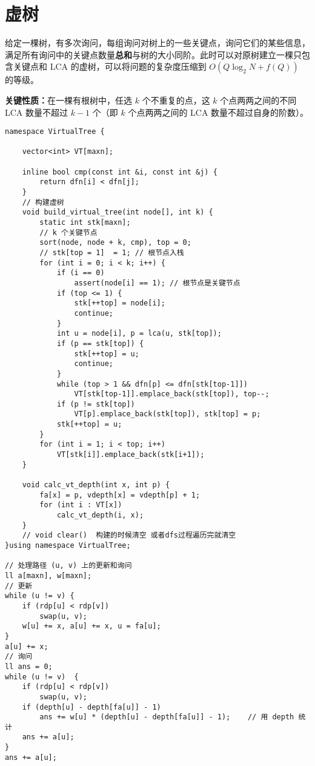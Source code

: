 \section{虚树}

\par \noindent 给定一棵树，有多次询问，每组询问对树上的一些关键点，询问它们的某些信息，满足所有询问中的关键点数量\textbf{总和}与树的大小同阶。此时可以对原树建立一棵只包含关键点和 LCA 的虚树，可以将问题的复杂度压缩到 $O(Q \log_2N + f(Q))$ 的等级。
~\\
\par \noindent \textbf{关键性质：}在一棵有根树中，任选 $k$ 个不重复的点，这  $k$ 个点两两之间的不同 LCA 数量不超过  $k-1$  个（即  $k$ 个点两两之间的 LCA 数量不超过自身的阶数）。
\begin{verbatim}
namespace VirtualTree {
    
    vector<int> VT[maxn];
    
    inline bool cmp(const int &i, const int &j) {
        return dfn[i] < dfn[j];
    }
    // 构建虚树
    void build_virtual_tree(int node[], int k) {
        static int stk[maxn];
        // k 个关键节点
        sort(node, node + k, cmp), top = 0;
        // stk[top = 1]  = 1; // 根节点入栈
        for (int i = 0; i < k; i++) {   
            if (i == 0)
                assert(node[i] == 1); // 根节点是关键节点
            if (top <= 1) {
                stk[++top] = node[i];
                continue;
            }
            int u = node[i], p = lca(u, stk[top]);
            if (p == stk[top]) {
                stk[++top] = u;
                continue;
            }
            while (top > 1 && dfn[p] <= dfn[stk[top-1]])
                VT[stk[top-1]].emplace_back(stk[top]), top--;
            if (p != stk[top])
                VT[p].emplace_back(stk[top]), stk[top] = p;
            stk[++top] = u;
        }
        for (int i = 1; i < top; i++)
            VT[stk[i]].emplace_back(stk[i+1]);
    }

    void calc_vt_depth(int x, int p) {
        fa[x] = p, vdepth[x] = vdepth[p] + 1;
        for (int i : VT[x])
            calc_vt_depth(i, x);
    }
    // void clear()  构建的时候清空 或者dfs过程遍历完就清空
}using namespace VirtualTree;

// 处理路径 (u, v) 上的更新和询问 
ll a[maxn], w[maxn];
// 更新
while (u != v) {
    if (rdp[u] < rdp[v])
        swap(u, v);
    w[u] += x, a[u] += x, u = fa[u];
}
a[u] += x;
// 询问
ll ans = 0;
while (u != v)  {
    if (rdp[u] < rdp[v])
        swap(u, v);
    if (depth[u] - depth[fa[u]] - 1)
        ans += w[u] * (depth[u] - depth[fa[u]] - 1);    // 用 depth 统计 
    ans += a[u];
}
ans += a[u];
\end{verbatim}